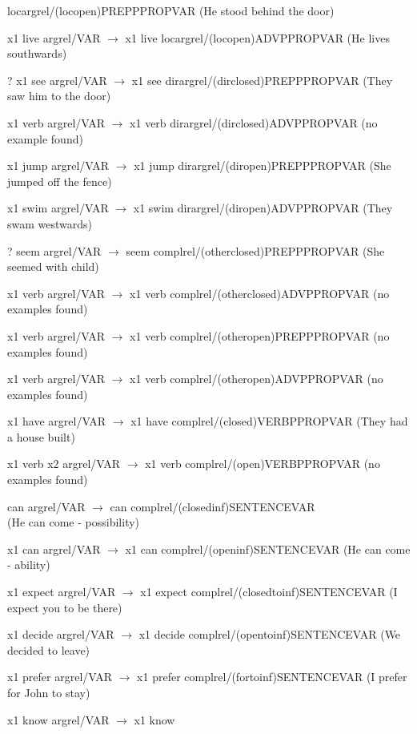 \begin{description}
\begin{description}
\begin{description}
locargrel/(locopen)PREPPPROPVAR 
(He stood behind the door)
  \item[7b2] x1 live argrel/VAR $\rightarrow$ x1 live
locargrel/(locopen)ADVPPROPVAR 
(He lives southwards)
  \item[8a1] ? x1 see argrel/VAR $\rightarrow$ x1 see
dirargrel/(dirclosed)PREPPPROPVAR 
(They saw him to the door)
  \item[8a2] x1 verb argrel/VAR $\rightarrow$ x1 verb
dirargrel/(dirclosed)ADVPPROPVAR 
(no example found)
  \item[8b1] x1 jump argrel/VAR $\rightarrow$ x1 jump
dirargrel/(diropen)PREPPPROPVAR 
(She jumped off the fence)
  \item[8b2] x1 swim argrel/VAR $\rightarrow$ x1 swim
dirargrel/(diropen)ADVPPROPVAR 
(They swam westwards)
  \item[9a1] ? seem argrel/VAR $\rightarrow$ seem
complrel/(otherclosed)PREPPPROPVAR 
(She seemed with child)
  \item[9a2] x1 verb argrel/VAR $\rightarrow$ x1 verb
complrel/(otherclosed)ADVPPROPVAR 
(no examples found)
  \item[9b1] x1 verb argrel/VAR $\rightarrow$ x1 verb
complrel/(otheropen)PREPPPROPVAR 
(no examples found)
  \item[9b2] x1 verb argrel/VAR $\rightarrow$ x1 verb
complrel/(otheropen)ADVPPROPVAR 
(no examples found)
  \item[10a] x1 have argrel/VAR $\rightarrow$ x1 have 
complrel/(closed)VERBPPROPVAR 
(They had a house built)
  \item[10b] x1 verb x2 argrel/VAR $\rightarrow$ x1 verb 
complrel/(open)VERBPPROPVAR 
(no examples found)
  \item[11a] can argrel/VAR $\rightarrow$ can 
complrel/(closedinf)SENTENCEVAR \\
(He can come - possibility)
  \item[11b] x1 can argrel/VAR $\rightarrow$ x1 can 
complrel/(openinf)SENTENCEVAR 
(He can come - ability)
  \item[12a] x1 expect argrel/VAR $\rightarrow$ x1 expect
complrel/(closedtoinf)SENTENCEVAR 
(I expect you to be there)
  \item[12b] x1 decide argrel/VAR $\rightarrow$ x1 decide
complrel/(opentoinf)SENTENCEVAR 
(We decided to leave)
  \item[13] x1 prefer argrel/VAR $\rightarrow$ x1 prefer
complrel/(fortoinf)SENTENCEVAR 
(I prefer for John to stay)
  \item[14] x1 know argrel/VAR $\rightarrow$ x1 know 

\end{description}
\end{description}
\end{description}
